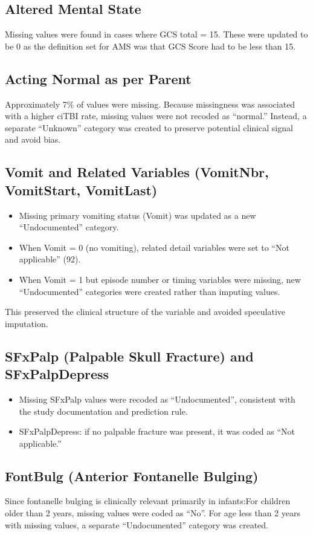 \documentclass[11pt]{article}
\begin{document}
    \subsection{Altered Mental State}
    Missing values were found in cases where GCS total = 15. These were updated to be 0 as the definition set for AMS was that GCS Score had to be less than 15.
    \subsection{Acting Normal as per Parent}
    Approximately 7\% of values were missing. Because missingness was associated with a higher ciTBI rate, missing values were not recoded as “normal.” Instead, a separate “Unknown” category was created to preserve potential clinical signal and avoid bias.
    \subsection{Vomit and Related Variables (VomitNbr, VomitStart, VomitLast)}
    \begin{itemize}
        \item Missing primary vomiting status (Vomit) was updated as a new “Undocumented” category.
        \item When Vomit = 0 (no vomiting), related detail variables were set to “Not applicable” (92).
        \item When Vomit = 1 but episode number or timing variables were missing, new “Undocumented” categories were created rather than imputing values.
    \end{itemize}
    This preserved the clinical structure of the variable and avoided speculative imputation.
    \subsection{SFxPalp (Palpable Skull Fracture) and SFxPalpDepress}
    \begin{itemize}
        \item Missing SFxPalp values were recoded as “Undocumented”, consistent with the study documentation and prediction rule.
        \item SFxPalpDepress: if no palpable fracture was present, it was coded as “Not applicable.”
    \end{itemize}
    \subsection{FontBulg (Anterior Fontanelle Bulging)}
    Since fontanelle bulging is clinically relevant primarily in infants:For children older than 2 years, missing values were coded as “No”. For age less than 2 years with missing values, a separate “Undocumented” category was created.
\end{document}
